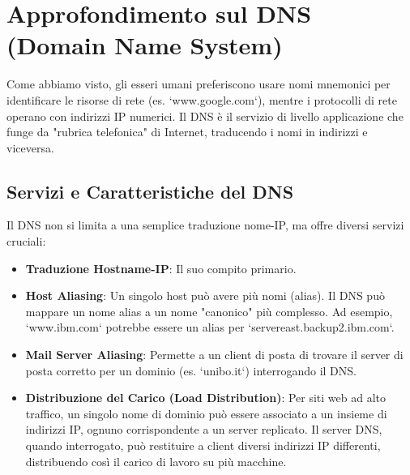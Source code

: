 \section{Approfondimento sul DNS (Domain Name System)}
Come abbiamo visto, gli esseri umani preferiscono usare nomi mnemonici per identificare le risorse di rete (es. `www.google.com`), mentre i protocolli di rete operano con indirizzi IP numerici. Il DNS è il servizio di livello applicazione che funge da "rubrica telefonica" di Internet, traducendo i nomi in indirizzi e viceversa.

\subsection{Servizi e Caratteristiche del DNS}
Il DNS non si limita a una semplice traduzione nome-IP, ma offre diversi servizi cruciali:
\begin{itemize}
    \item \textbf{Traduzione Hostname-IP}: Il suo compito primario.
    \item \textbf{Host Aliasing}: Un singolo host può avere più nomi (alias). Il DNS può mappare un nome alias a un nome "canonico" più complesso. Ad esempio, `www.ibm.com` potrebbe essere un alias per `servereast.backup2.ibm.com`.
    \item \textbf{Mail Server Aliasing}: Permette a un client di posta di trovare il server di posta corretto per un dominio (es. `unibo.it`) interrogando il DNS.
    \item \textbf{Distribuzione del Carico (Load Distribution)}: Per siti web ad alto traffico, un singolo nome di dominio può essere associato a un insieme di indirizzi IP, ognuno corrispondente a un server replicato. Il server DNS, quando interrogato, può restituire a client diversi indirizzi IP differenti, distribuendo così il carico di lavoro su più macchine.
\end{itemize}


